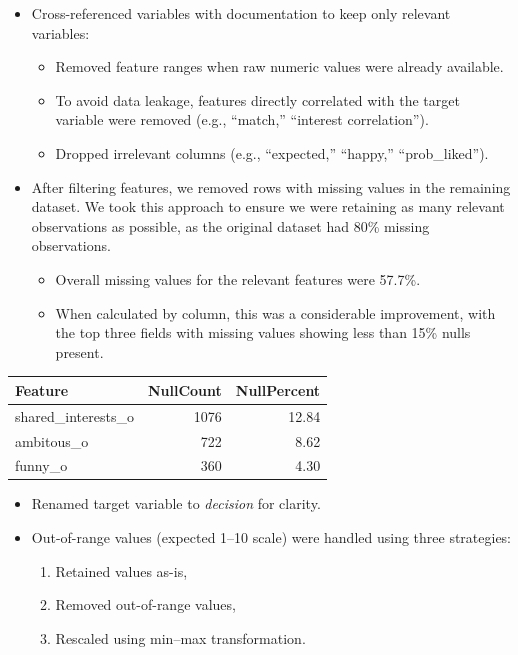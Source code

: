 \documentclass[
  letterpaper,
  DIV=11,
  numbers=noendperiod]{scrartcl}
\providecommand{\tightlist}{%
  \setlength{\itemsep}{0pt}\setlength{\parskip}{0pt}}\usepackage{longtable,booktabs,array}
\begin{document}
\begin{itemize}
\tightlist
\item
  Cross-referenced variables with documentation to keep only relevant
  variables:

  \begin{itemize}
  \tightlist
  \item
    Removed feature ranges when raw numeric values were already
    available.
  \item
    To avoid data leakage, features directly correlated with the target
    variable were removed (e.g., ``match,'' ``interest correlation'').
  \item
    Dropped irrelevant columns (e.g., ``expected,'' ``happy,''
    ``prob\_liked'').
  \end{itemize}
\item
  After filtering features, we removed rows with missing values in the
  remaining dataset. We took this approach to ensure we were retaining
  as many relevant observations as possible, as the original dataset had
  80\% missing observations.

  \begin{itemize}
  \tightlist
  \item
    Overall missing values for the relevant features were 57.7\%.
  \item
    When calculated by column, this was a considerable improvement, with
    the top three fields with missing values showing less than 15\%
    nulls present.
  \end{itemize}
\end{itemize}

\begin{table}
\fontsize{12.0pt}{14.4pt}\selectfont
\begin{tabular*}{\linewidth}{@{\extracolsep{\fill}}lrr}
\toprule
Feature & NullCount & NullPercent \\ 
\midrule\addlinespace[2.5pt]
shared\_interests\_o & 1076 & 12.84 \\ 
ambitous\_o & 722 & 8.62 \\ 
funny\_o & 360 & 4.30 \\ 
\bottomrule
\end{tabular*}
\end{table}

\begin{itemize}
\tightlist
\item
  Renamed target variable to \emph{decision} for clarity.
\item
  Out-of-range values (expected 1--10 scale) were handled using three
  strategies:

  \begin{enumerate}
  \def\labelenumi{\arabic{enumi}.}
  \tightlist
  \item
    Retained values as-is,
  \item
    Removed out-of-range values,
  \item
    Rescaled using min--max transformation.
  \end{enumerate}
\end{itemize}
\end{document}
